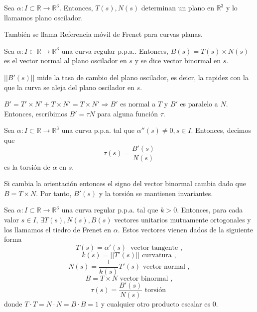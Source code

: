 \begin{defn}
  Sea $\alpha  : I \subset \mathbb{R} \to \mathbb{R}^{3}$. Entonces, $T(s),N(s)$ determinan un plano en $\mathbb{R}^{3}$ y lo llamamos plano oscilador.
\end{defn}

\begin{obs}
  También se llama Referencia móvil de Frenet para curvas planas.
\end{obs}

\begin{defn}
  Sea $\alpha  : I \subset \mathbb{R} \to \mathbb{R}^{3}$ una curva regular p.p.a.. Entonces, $B(s) = T(s) \times N(s)$ es el vector normal al plano oscilador en $s$ y se dice vector binormal en $s$.
\end{defn}

\begin{obs}
  $||B'(s)||$ mide la tasa de cambio del plano oscilador, es deicr, la rapidez con la que la curva se aleja del plano oscilador en $s$.
\end{obs}

\begin{note}
  $B' = T' \times N' + T \times N' = T \times N' \Rightarrow B'$ es normal a $T$ y $B'$ es paralelo a $N$. Entonces, escribimos $B' = \tau N$ para alguna función $\tau$.
\end{note}

\begin{defn}[Torsión]
  Sea $\alpha  : I \subset \mathbb{R} \to \mathbb{R}^{3}$ una curva p.p.a. tal que $\alpha''(s) \neq 0, s \in I$. Entonces, decimos que
  \[
    \tau(s) = \frac{B'(s)}{N(s)}
  \]
  es la torsión de $\alpha$ en $s$.
\end{defn}

\begin{obs}
  Si cambia la orientación entonces el signo del vector binormal cambia dado que $B = T \times N$. Por tanto, $B'(s)$ y la torsión se mantienen invariantes. 
\end{obs}

\begin{defn}
  Sea $\alpha  : I \subset \mathbb{R} \to \mathbb{R}^{3}$ una curva regular p.p.a. tal que $k>0$. Entonces, para cada valor $s \in I$, $\exists T(s), N(s), B(s)$ vectores unitarios mutuamente ortogonales y los llamamos el tiedro de Frenet en $\alpha$. Estos vectores vienen dados de la siguiente forma
  \[ 
    T(s) = \alpha'(s) \ \text{ vector tangente } ,
  \] 
  \[ 
    k(s) = ||T'(s)||  \text{ curvatura } ,
  \] 
  \[ 
    N(s) = \frac{1}{k(s)}T'(s)  \text{ vector normal } ,
  \]
  \[ 
    B = T \times N  \text{ vector binormal } ,
  \] 
  \[ 
    \tau(s) = \frac{B'(s)}{N(s)}  \text{ torsión } 
  \] 
  donde $T \cdot T = N \cdot N = B \cdot B = 1$ y cualquier otro producto escalar es $0$.
\end{defn}

